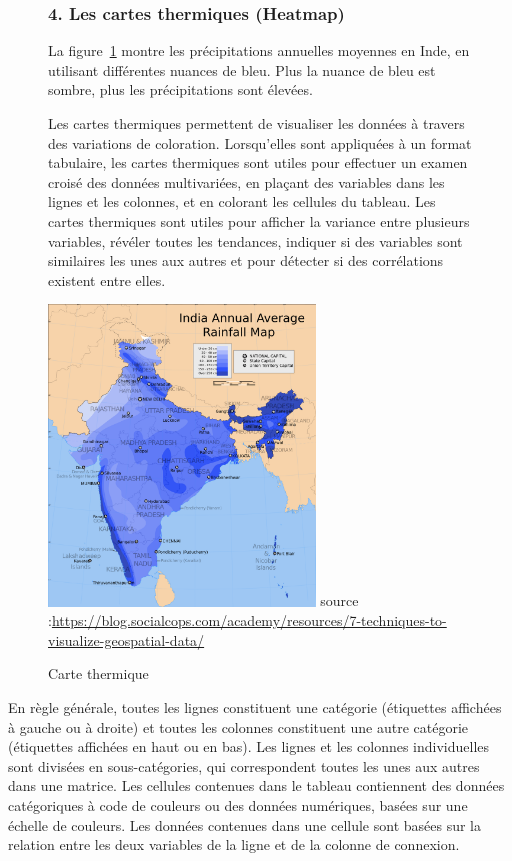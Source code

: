 \documentclass[french, a4paper, 12pt]{report}
\begin{document}
\begin{figure}[!htb]
\begin{minipage}{0.46\linewidth}

\subsubsection{4. Les cartes thermiques (Heatmap)}
La figure~\ref{fig:2.7} montre les précipitations annuelles moyennes en Inde, en utilisant différentes nuances de bleu. Plus la nuance de bleu est sombre, plus les précipitations sont élevées.

Les cartes thermiques permettent de visualiser les données à travers des variations de coloration. Lorsqu'elles sont appliquées à un format tabulaire, les cartes thermiques sont utiles pour effectuer un examen croisé des données multivariées, en plaçant des variables dans les lignes et les colonnes, et en colorant les cellules du tableau.
Les cartes thermiques sont utiles pour afficher la variance entre plusieurs variables, révéler toutes les tendances, indiquer si des variables sont similaires les unes aux autres et pour détecter si des corrélations existent entre elles.
\end{minipage}\hfil
\begin{minipage}{0.35\linewidth}
\centering
    \includegraphics[height=8cm]{images/Heatmap.png}
    \scriptsize{source :\url{https://blog.socialcops.com/academy/resources/7-techniques-to-visualize-geospatial-data/}}
    \caption{Carte thermique}
 \label{fig:2.7}
\end{minipage}
\end{figure}

En règle générale, toutes les lignes constituent une catégorie (étiquettes affichées à gauche ou à droite) et toutes les colonnes constituent une autre catégorie (étiquettes affichées en haut ou en bas). Les lignes et les colonnes individuelles sont divisées en sous-catégories, qui correspondent toutes les unes aux autres dans une matrice. Les cellules contenues dans le tableau contiennent des données catégoriques à code de couleurs ou des données numériques, basées sur une échelle de couleurs. Les données contenues dans une cellule sont basées sur la relation entre les deux variables de la ligne et de la colonne de connexion.
\end{document}
